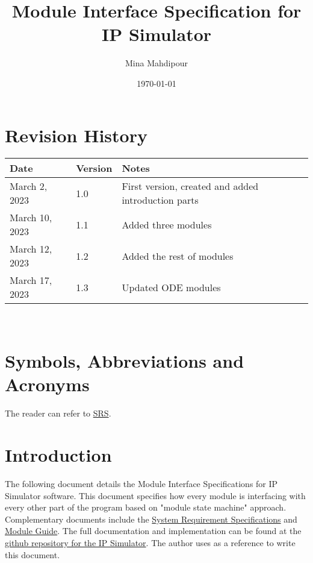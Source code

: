 \documentclass[12pt, titlepage]{article}
\begin{document}
\title{Module Interface Specification for IP Simulator}

\author{Mina Mahdipour}

\date{\today}

\maketitle


\section{Revision History}

\begin{tabularx}{\textwidth}{p{3cm}p{2cm}X}
\toprule {\bf Date} & {\bf Version} & {\bf Notes}\\
\midrule
March 2, 2023 & 1.0 & First version, created and added introduction parts\\
March 10, 2023 & 1.1 &  Added three modules\\
March 12, 2023 & 1.2 &  Added the rest of modules\\
March 17, 2023 & 1.3 &  Updated ODE modules\\
\bottomrule
\end{tabularx}

~\newpage

\section{Symbols, Abbreviations and Acronyms}

The reader can refer to \href{https://github.com/MinMah23/CAS741-Project/tree/main/docs/SRS}{SRS}. 

\newpage

\tableofcontents
\listoftables


\newpage


\section{Introduction}

The following document details the Module Interface Specifications for IP Simulator software. This document specifies how every module is interfacing with every other part of the program based on "module state machine" approach.
\\Complementary documents include the \href{https://github.com/MinMah23/CAS741-Project/tree/main/docs/SRS}{System Requirement Specifications}
and \href{https://github.com/MinMah23/CAS741-Project/tree/main/docs/Design/SoftArchitecture}{Module Guide}.  The full documentation and implementation can be
found at the \href{https://github.com/MinMah23/CAS741-Project}{github repository for the IP Simulator}. The author uses \cite{Smith2016} as a reference to write this document.
\end{document}
